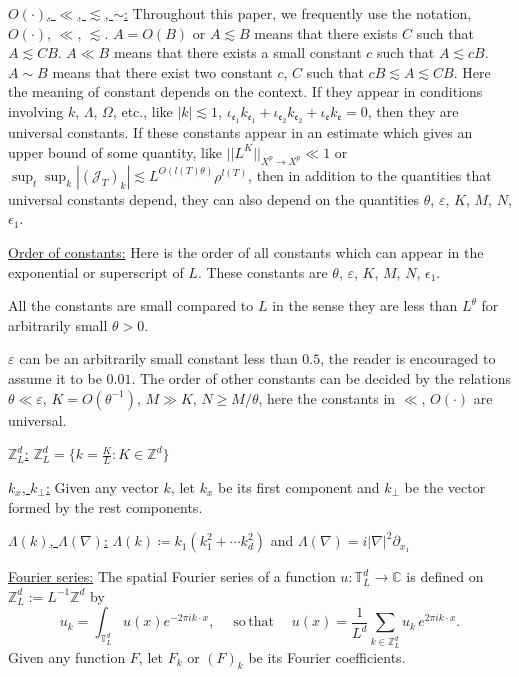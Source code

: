 \underline{$O(\cdot)$, $\ll$, $\lesssim$, $\sim$:} Throughout this paper, we frequently use the notation, $O(\cdot)$, $\ll$, $\lesssim$. $A=O(B)$ or $A\lesssim B$ means that there exists $C$ such that $A\lesssim CB$. $A\ll B$ means that there exists a small constant $c$ such that $A\lesssim cB$. $A\sim B$ means that there exist two constant $c$, $C$ such that $cB\lesssim A\lesssim CB$. Here the meaning of constant depends on the context. If they appear in conditions involving $k$, $\Lambda$, $\Omega$, etc., like $|k|\lesssim 1$, $\iota_{\mathfrak{e}_1}k_{\mathfrak{e}_1}+\iota_{\mathfrak{e}_2}k_{\mathfrak{e}_2}+\iota_{\mathfrak{e}}k_{\mathfrak{e}}=0$, then they are universal constants. If these constants appear in an estimate which gives an upper bound of some quantity, like $||L^K||_{X^p\rightarrow X^p}\ll 1$ or $\sup_t\sup_k |(\mathcal{J}_T)_k|\lesssim L^{O(l(T)\theta)} \rho^{l(T)}$, then in addition to the quantities that universal constants depend, they can also depend on the quantities $\theta$, $\varepsilon$, $K$, $M$, $N$, $\epsilon_1$.

\underline{Order of constants:} Here is the order of all constants which can appear in the exponential or superscript of $L$. These constants are $\theta$, $\varepsilon$, $K$, $M$, $N$, $\epsilon_1$.%

All the constants are small compared to $L$ in the sense they are less than $L^{\theta}$ for arbitrarily small $\theta>0$.

$\varepsilon$ can be an arbitrarily small constant less than $0.5$, the reader is encouraged to assume it to be $0.01$. The order of other constants can be decided by the relations $\theta\ll \varepsilon$, $K=O(\theta^{-1})$, $M\gg K$, $N\ge M/\theta$, here the constants in $\ll$, $O(\cdot)$ are universal. 

\underline{$\mathbb{Z}_L^d$:} $\mathbb{Z}_L^d= \{k=\frac{K}{L}:K\in \mathbb{Z}^d\}$

\underline{$k_x$, $k_{\perp}$:} Given any vector $k$, let $k_x$ be its first component and $k_{\perp}$ be the vector formed by the rest components. 

\underline{$\Lambda(k)$, $\Lambda(\nabla)$:} $\Lambda(k)\coloneqq k_{1}(k_1^2+\cdots k_d^2)$ and $\Lambda(\nabla) = i|\nabla|^2\partial_{x_1}$

\underline{Fourier series:} The spatial Fourier series of a function $u: \mathbb{T}_L^d \to \mathbb C$ is defined on $\mathbb{Z}^d_L:=L^{-1}\mathbb{Z}^{d}$ by
\begin{equation}\label{fourierset}
u_k=\int_{\mathbb{T}^d_L} u(x) e^{-2\pi i k\cdot x},\quad \mathrm{\; so \,that \;}\quad u(x)=\frac{1}{L^d}\sum_{k \in \mathbb{Z}^d_L} u_k \,e^{2\pi i k\cdot x}. 
\end{equation}
Given any function $F$, let $F_k$ or $(F)_k$ be its Fourier coefficients.

